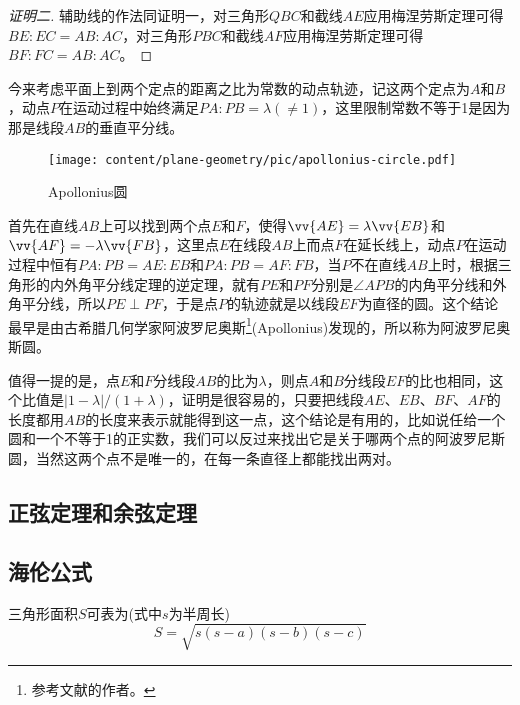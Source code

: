 \begin{proof}[证明二]
  辅助线的作法同证明一，对三角形$QBC$和截线$AE$应用梅涅劳斯定理可得$BE:EC=AB:AC$，对三角形$PBC$和截线$AF$应用梅涅劳斯定理可得$BF:FC=AB:AC$。
\end{proof}

\begin{example}[阿波罗尼奥斯圆]
  今来考虑平面上到两个定点的距离之比为常数的动点轨迹，记这两个定点为$A$和$B$，动点$P$在运动过程中始终满足$PA:PB=\lambda(\neq 1)$，这里限制常数不等于1是因为那是线段$AB$的垂直平分线。

\begin{figure}[htbp]
\centering
\texttt{[image: content/plane-geometry/pic/apollonius-circle.pdf]}
\caption{Apollonius圆}
\label{fig:apollonius-circle}
\end{figure}

 首先在直线$AB$上可以找到两个点$E$和$F$，使得$\vv{AE}=\lambda\vv{EB}$和$\vv{AF}=-\lambda\vv{FB}$，这里点$E$在线段$AB$上而点$F$在延长线上，动点$P$在运动过程中恒有$PA:PB=AE:EB$和$PA:PB=AF:FB$，当$P$不在直线$AB$上时，根据三角形的内外角平分线定理的逆定理，就有$PE$和$PF$分别是$\angle APB$的内角平分线和外角平分线，所以$PE \perp PF$，于是点$P$的轨迹就是以线段$EF$为直径的圆。这个结论最早是由古希腊几何学家阿波罗尼奥斯\footnote{参考文献\cite{conic-sections}的作者。}(Apollonius)发现的，所以称为阿波罗尼奥斯圆。

 值得一提的是，点$E$和$F$分线段$AB$的比为$\lambda$，则点$A$和$B$分线段$EF$的比也相同，这个比值是$|1-\lambda|/(1+\lambda)$，证明是很容易的，只要把线段$AE$、$EB$、$BF$、$AF$的长度都用$AB$的长度来表示就能得到这一点，这个结论是有用的，比如说任给一个圆和一个不等于1的正实数，我们可以反过来找出它是关于哪两个点的阿波罗尼斯圆，当然这两个点不是唯一的，在每一条直径上都能找出两对。
\end{example}

\subsection{正弦定理和余弦定理}
\label{sec:sine-theorem-and-cosine-theorem}

\subsection{海伦公式}
\label{sec:helen-area-formula}

\begin{theorem}[海伦(Helen)公式]
  三角形面积$S$可表为(式中$s$为半周长)
  \begin{equation}
    \label{eq:helen-area-formula}
    S = \sqrt{s(s-a)(s-b)(s-c)}
  \end{equation}
\end{theorem}

